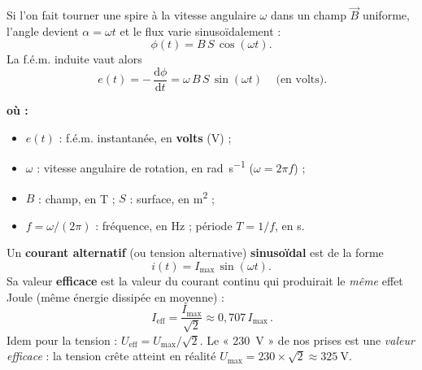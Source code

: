 \documentclass[11pt,a4paper]{article}
\newenvironment{ou}{%
  \par\smallskip\noindent\textbf{où :}\nopagebreak
  \begin{itemize}[leftmargin=1.8em,topsep=2pt,itemsep=1.5pt,parsep=0pt]}%
  {\end{itemize}}
\newcommand{\Bvec}{\vec{B}}
\newcommand{\dd}{\mathrm{d}}
\begin{document}
\begin{formule}
Si l'on fait tourner une spire à la vitesse angulaire $\omega$ dans un champ $\Bvec$ uniforme,
l'angle devient $\alpha=\omega t$ et le flux varie sinusoïdalement :
\[ \phi(t) = B\,S\,\cos(\omega t). \]
La f.é.m. induite vaut alors
\[ \boxed{\,e(t) = -\,\dfrac{\dd\phi}{\dd t} = \omega\, B\, S\, \sin(\omega t)\,} \quad\text{(en volts).} \]
\begin{ou}
  \item $e(t)$ : f.é.m. instantanée, en \textbf{volts} (\si{\volt}) ;
  \item $\omega$ : vitesse angulaire de rotation, en \si{\radian\per\second} ($\omega=2\pi f$) ;
  \item $B$ : champ, en \si{\tesla} ; $S$ : surface, en \si{\metre\squared} ;
  \item $f=\omega/(2\pi)$ : fréquence, en \si{\hertz} ; période $T=1/f$, en \si{\second}.
\end{ou}
\end{formule}

\begin{definition}
Un \textbf{courant alternatif} (ou tension alternative) \textbf{sinusoïdal} est de la forme
\[ i(t) = I_{\max}\,\sin(\omega t). \]
Sa valeur \textbf{efficace} est la valeur du courant continu qui produirait le \emph{même} effet
Joule (même énergie dissipée en moyenne) :
\[ \boxed{\,I_{\text{eff}} = \dfrac{I_{\max}}{\sqrt{2}} \approx 0{,}707\, I_{\max}\,}. \]
Idem pour la tension : $U_{\text{eff}} = U_{\max}/\sqrt{2}$. Le « \SI{230}{\volt} » de nos prises
est une \emph{valeur efficace} : la tension crête atteint en réalité
$U_{\max}=230\times\sqrt{2}\approx\SI{325}{\volt}$.
\end{definition}

\begin{center}
\end{center}
\end{document}
